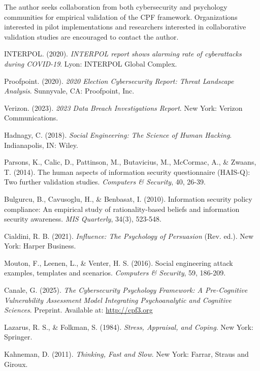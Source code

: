 \documentclass[11pt,a4paper]{article}
\begin{document}
The author seeks collaboration from both cybersecurity and psychology communities for empirical validation of the CPF framework. Organizations interested in pilot implementations and researchers interested in collaborative validation studies are encouraged to contact the author.

\begin{thebibliography}{99}

 INTERPOL. (2020). \textit{INTERPOL report shows alarming rate of cyberattacks during COVID-19}. Lyon: INTERPOL Global Complex.

 Proofpoint. (2020). \textit{2020 Election Cybersecurity Report: Threat Landscape Analysis}. Sunnyvale, CA: Proofpoint, Inc.

 Verizon. (2023). \textit{2023 Data Breach Investigations Report}. New York: Verizon Communications.

 Hadnagy, C. (2018). \textit{Social Engineering: The Science of Human Hacking}. Indianapolis, IN: Wiley.

 Parsons, K., Calic, D., Pattinson, M., Butavicius, M., McCormac, A., \& Zwaans, T. (2014). The human aspects of information security questionnaire (HAIS-Q): Two further validation studies. \textit{Computers \& Security}, 40, 26-39.

 Bulgurcu, B., Cavusoglu, H., \& Benbasat, I. (2010). Information security policy compliance: An empirical study of rationality-based beliefs and information security awareness. \textit{MIS Quarterly}, 34(3), 523-548.

 Cialdini, R. B. (2021). \textit{Influence: The Psychology of Persuasion} (Rev. ed.). New York: Harper Business.

 Mouton, F., Leenen, L., \& Venter, H. S. (2016). Social engineering attack examples, templates and scenarios. \textit{Computers \& Security}, 59, 186-209.

 Canale, G. (2025). \textit{The Cybersecurity Psychology Framework: A Pre-Cognitive Vulnerability Assessment Model Integrating Psychoanalytic and Cognitive Sciences}. Preprint. Available at: \url{http://cpf3.org}

 Lazarus, R. S., \& Folkman, S. (1984). \textit{Stress, Appraisal, and Coping}. New York: Springer.

 Kahneman, D. (2011). \textit{Thinking, Fast and Slow}. New York: Farrar, Straus and Giroux.


\end{thebibliography}
\end{document}

